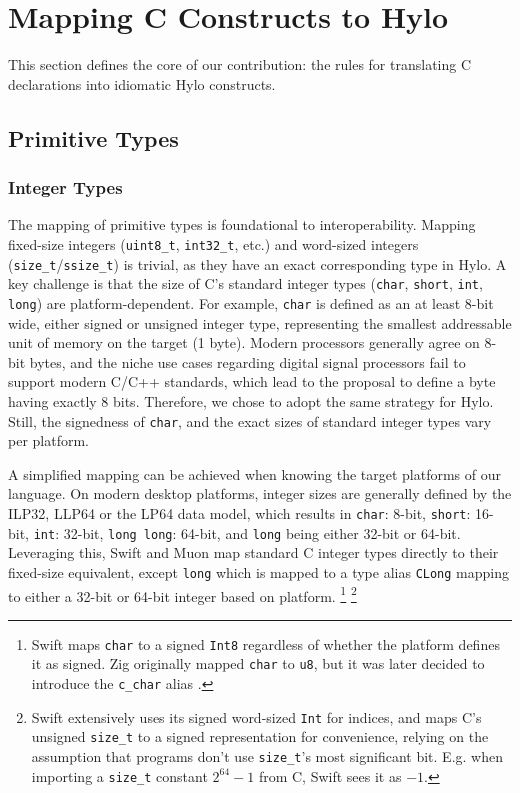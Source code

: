 \section{Mapping C Constructs to Hylo}
\label{sec:mapping_c_constructs}

This section defines the core of our contribution: the rules for translating C declarations into idiomatic Hylo constructs.

\subsection{Primitive Types}
\subsubsection{Integer Types}
The mapping of primitive types is foundational to interoperability. Mapping fixed-size integers (\texttt{uint8\_t}, \texttt{int32\_t}, etc.) and word-sized integers (\texttt{size\_t}/\texttt{ssize\_t}) is trivial, as they have an exact corresponding type in Hylo. A key challenge is that the size of C's standard integer types (\texttt{char}, \texttt{short}, \texttt{int}, \texttt{long}) are platform-dependent. For example, \texttt{char} is defined as an at least 8-bit wide, either signed or unsigned integer type, representing the smallest addressable unit of memory on the target (1 byte). Modern processors generally agree on 8-bit bytes, and the niche use cases regarding digital signal processors fail to support modern C/C++ standards, which lead to the proposal \cite{P3477R1} to define a byte having exactly 8 bits. Therefore, we chose to adopt the same strategy for Hylo. Still, the signedness of \texttt{char}, and the exact sizes of standard integer types vary per platform.



A simplified mapping can be achieved when knowing the target platforms of our language. On modern desktop platforms, integer sizes are generally defined by the ILP32, LLP64 or the LP64 data model, which results in \texttt{char}: 8-bit, \texttt{short}: 16-bit, \texttt{int}: 32-bit, \texttt{long long}: 64-bit, and \texttt{long} being either 32-bit or 64-bit. Leveraging this, Swift and Muon map standard C integer types directly to their fixed-size equivalent, except \texttt{long} which is mapped to a type alias \texttt{CLong} mapping to either a 32-bit or 64-bit integer based on platform.
\footnote{
    Swift maps \texttt{char} to a signed \texttt{Int8} regardless of whether the platform defines it as signed. Zig originally mapped \texttt{char} to \texttt{u8}, but it was later decided to introduce the \texttt{c\_char} alias \cite{zig-add-cchar}.
}
\footnote{
    Swift extensively uses its signed word-sized \texttt{Int} for indices, and maps C's unsigned \texttt{size\_t} to a signed representation for convenience, relying on the assumption that programs don't use \texttt{size\_t}'s most significant bit. E.g. when importing a \texttt{size\_t} constant $2^{64} -1$ from C, Swift sees it as $-1$.
}



